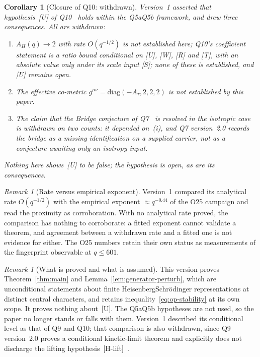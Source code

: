 \documentclass[12pt,a4paper]{article}
\newtheorem{corollary}[theorem]{Corollary}
\theoremstyle{definition}
\theoremstyle{remark}
\newtheorem{remark}[theorem]{Remark}
\begin{document}
    \begin{corollary}[Closure of Q10: withdrawn]\label{cor:q10}
      Version~1 asserted that hypothesis~[U] of Q10~\cite{Beau2026q10} holds within the
      Q5a\textendash Q5b framework, and drew three consequences.
      All are withdrawn:
      \begin{enumerate}
        \item[(i)] $A_H(q) \to 2$ with rate $O(q^{-1/2})$ is \emph{not} established here;
        Q10's coefficient statement is a ratio bound conditional on [U], [W], [R] and [T], with
        an absolute value only under its scale input [S]; none of these is established, and [U]
        remains open.
        \item[(ii)] The effective co-metric $g^{\mu\nu} = \mathrm{diag}(-A_\tau,2,2,2)$ is not
        established by this paper.
        \item[(iii)] The claim that the Bridge conjecture of Q7~\cite{Beau2026q7} is resolved
        in the isotropic case is withdrawn on two counts: it depended on~(i), and Q7
        version~2.0 records the bridge as a missing identification on a supplied carrier,
        not as a conjecture awaiting only an isotropy input.
      \end{enumerate}
      Nothing here shows~[U] to be false; the hypothesis is open, as are its consequences.
    \end{corollary}

    \begin{remark}[Rate versus empirical exponent]\label{rem:rate}
      Version~1 compared its analytical rate $O(q^{-1/2})$ with the empirical exponent
      $\approx q^{-0.44}$ of the O25 campaign and read the proximity as corroboration.
      With no analytical rate proved, the comparison has nothing to corroborate: a fitted
      exponent cannot validate a theorem, and agreement between a withdrawn rate and a fitted
      one is not evidence for either.
      The O25 numbers retain their own status as measurements of the fingerprint observable
      at $q \leq 601$.
    \end{remark}

    \begin{remark}[What is proved and what is assumed]\label{rem:epistemic}
      This version proves Theorem~\ref{thm:main} and Lemma~\ref{lem:generator-perturb}, which
      are unconditional statements about finite Heisenberg\textendash Schr\"odinger
      representations at distinct central characters, and retains
      inequality~\eqref{eq:op-stability} at its own scope.
      It proves nothing about~[U].
      The Q5a\textendash Q5b hypotheses are not used, so the paper no longer stands or falls
      with them.
      Version~1 described its conditional level as that of Q9 and Q10; that comparison is
      also withdrawn, since Q9 version~2.0 proves a conditional kinetic-limit theorem and
      explicitly does not discharge the lifting hypothesis~[H-lift]~\cite{Beau2026q9}.
    \end{remark}
\end{document}
